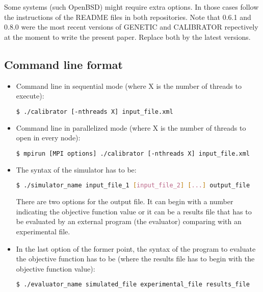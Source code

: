 \documentclass[review,authoryear]{elsarticle}
\begin{document}
Some systems (such OpenBSD) might require extra options. In those cases follow the instructions of the README files in both repositories.
Note that 0.6.1 and 0.8.0 were the most recent versions of GENETIC and CALIBRATOR repectively at the moment to write the present paper. Replace both by the latest versions.

\subsection{Command line format}

\begin{itemize}

\item Command line in sequential mode (where X is the number of threads to
execute):
\begin{lstlisting}[language=bash,basicstyle=\scriptsize]
$ ./calibrator [-nthreads X] input_file.xml
\end{lstlisting}

\item Command line in parallelized mode (where X is the number of threads to
open in every node):
\begin{lstlisting}[language=bash,basicstyle=\scriptsize]
$ mpirun [MPI options] ./calibrator [-nthreads X] input_file.xml
\end{lstlisting}

\item The syntax of the simulator has to be:
\begin{lstlisting}[language=bash,basicstyle=\scriptsize]
$ ./simulator_name input_file_1 [input_file_2] [...] output_file
\end{lstlisting}
There are two options for the output file. It can begin with a number indicating
the objective function value or it can be a results file that has to be
evaluated by an external program (the evaluator) comparing with an experimental
file.

\item In the last option of the former point, the syntax of the program to
evaluate the objective function has to be (where the results file has to begin
with the objective function value):
\begin{lstlisting}[language=bash,basicstyle=\scriptsize]
$ ./evaluator_name simulated_file experimental_file results_file
\end{lstlisting}

\end{itemize}
\end{document}
